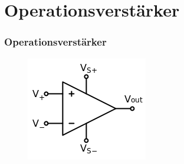 \section*{Operations\-verstärker}
\begin{frame}
\frametitle{Operationsverstärker}
\begin{minipage}{0.4\textwidth}
	 \begin{figure}
      \includegraphics[width=\textwidth,height=.5\textheight,keepaspectratio]{e13/OPV.png}
    \end{figure}
\end{minipage}
\hspace{0.5cm}
\begin{minipage}{0.4\textwidth}
	\begin{figure}

\end{figure}
\end{minipage}
\end{frame}
